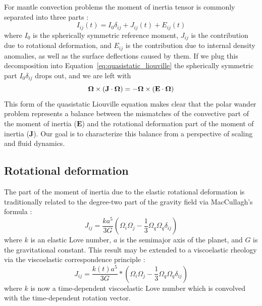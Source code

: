 \documentclass[extra,mreferee]{gji}
\begin{document}
For mantle convection problems the moment of inertia tensor is commonly separated into three parts \citep{sabadini1981pleistocene, spada1992excitation}:
\begin{equation}
I_{ij}(t) = I_0 \delta_{ij} + J_{ij}(t) + E_{ij}(t)
\label{eq:separation}
\end{equation}
where $I_0$ is the spherically symmetric reference moment, $J_{ij}$ is the contribution due to rotational deformation, and $E_{ij}$ is the contribution due to internal density anomalies, as well as the surface deflections caused by them.
If we plug this decomposition into Equation~\eqref{eq:quasistatic_liouville} the spherically symmetric part $I_0 \delta_{ij}$ drops out, and we are left with
\begin{equation}
\mathbf{\Omega} \times (\mathbf{J} \cdot \mitbf{\Omega}) = -\mitbf{\Omega} \times ( \mathbf{E} \cdot \mitbf{\Omega} )
\label{eq:disequilibrium}
\end{equation}
This form of the quasistatic Liouville equation makes clear that the polar wander problem represents a balance between the mismatches
of the convective part of the moment of inertia ($\mathbf{E}$) and the rotational deformation part of the moment of inertia ($\mathbf{J}$).
Our goal is to characterize this balance from a perspective of scaling and fluid dynamics.

\subsection{Rotational deformation}
\label{sec:rotational_deformation}

The part of the moment of inertia due to the elastic rotational deformation is traditionally related to the degree-two part of the gravity field via MacCullagh's formula \citep{munk1960rotation}:
\begin{equation}
J_{ij} = \frac{k a^5}{3 G} \left( \Omega_i \Omega_j - \frac{1}{3} \Omega_q \Omega_q \delta_{ij} \right)
\label{eq:elastic_deformation}
\end{equation}
where $k$ is an elastic Love number, $a$ is the semimajor axis of the planet, and $G$ is the gravitational constant.
This result may be extended to a viscoelastic rheology via the viscoelastic correspondence principle \citep[e.g.][]{peltier1974impulse}:
\begin{equation}
J_{ij} = \frac{k(t) a^5}{3 G} * \left( \Omega_i \Omega_j - \frac{1}{3} \Omega_q \Omega_q \delta_{ij} \right)
\label{eq:viscoelastic_deformation}
\end{equation}
where $k$ is now a time-dependent viscoelastic Love number which is convolved with the time-dependent rotation vector.
\end{document}
